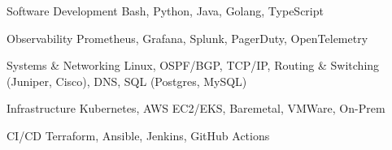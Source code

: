 

\begin{cvskills}

  \cvskill
    {Software Development} %
    {Bash, Python, Java, Golang, TypeScript} %

  \cvskill
    {Observability} %
    {Prometheus, Grafana, Splunk, PagerDuty, OpenTelemetry} %

  \cvskill
    {Systems \& Networking} %
    {Linux, OSPF/BGP, TCP/IP, Routing \& Switching (Juniper, Cisco), DNS, SQL (Postgres, MySQL)} %


  \cvskill
    {Infrastructure} %
    {Kubernetes, AWS EC2/EKS, Baremetal, VMWare, On-Prem} %

  \cvskill
    {CI/CD} %
    {Terraform, Ansible, Jenkins, GitHub Actions} %


\end{cvskills}
